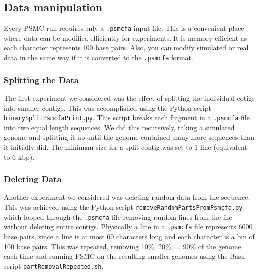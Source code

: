 \documentclass[11pt,a4paper]{article}
\begin{document}
\subsection{Data manipulation} 
Every PSMC run requires only a \verb|.psmcfa| input file. This is a convenient place where data can be modified efficiently for experiments. It is memory-efficient as each character represents 100 base pairs. Also, you can modify simulated or real data in the same way if it is converted to the \verb|.psmcfa| format.

\subsubsection{Splitting the Data}
The first experiment we considered was the effect of splitting the individual cotigs into smaller contigs. This was accomplished using the Python script \verb|binarySplitPsmcfaPrint.py|. This script breaks each fragment in a \verb|.psmcfa| file into two equal length sequences. We did this recursively, taking a simulated genome and splitting it up until the genome contained many more sequences than it initially did. The minimum size for a split contig was set to 1 line (equivalent to 6 kbp).


\subsubsection{Deleting Data}
Another experiment we considered was deleting random data from the sequence. This was achieved using the Python script \verb|removeRandomPartsFromPsmcfa.py| which looped through the \verb|.psmcfa| file removing random lines from the file without deleting entire contigs. Physically a line in a \verb|.psmcfa| file represents 6000 base pairs, since a line is at most 60 characters long and each character is a bin of 100 base pairs. This was repeated, removing 10\%, 20\%, ... 90\% of the genome each time and running PSMC on the resulting smaller genomes using the Bash script \verb|partRemovalRepeated.sh|.
\end{document}
